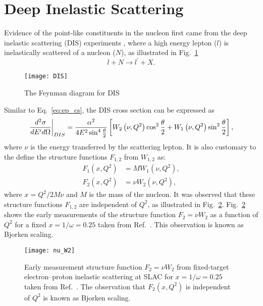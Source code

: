 \documentclass[../main.tex]{subfiles}
\begin{document}
\section {Deep Inelastic Scattering}
\label{sec:dis}
Evidence of the point-like constituents in the nucleon first came from the deep
inelastic scattering (DIS) experiments \cite{breidenbach1969}, where a high 
energy lepton ($l$) is inelastically scattered of a nucleon ($N$), as 
illustrated in Fig.\ \ref{fig:DIS}
\begin{equation}
	l + N \rightarrow l^\prime + X.
\end{equation}
\begin{figure}[htbp!]
    \centering
    \texttt{[image: DIS]}
    \caption{The Feynman diagram for DIS}
    \label{fig:DIS}
\end{figure}
Similar to Eq.\ \ref{eq:ep_cs}, the DIS cross section can be expressed as 
\begin{equation}
	\eval{\frac{d^2\sigma}{dE^\prime d\Omega}}_{DIS} = \frac{\alpha^2}{4E^2 \sin^4 
	\frac{\theta}{2}} \left[ W_2\left(\nu,Q^2\right)\cos^2
	\frac{\theta}{2} + W_1\left(\nu,Q^2\right)\sin^2 \frac{\theta}{2}
	\right],
	\label{eq:DIS_cs1}
\end{equation}
where $\nu$ is the energy transferred by the scattering lepton. It is also 
customary to the define the structure functions $F_{1,2}$ from $W_{1,2}$ as:
\begin{equation}
	\begin{split}
		F_1\left(x,Q^2\right) &= MW_1\left(\nu,Q^2\right),\\
		F_2\left(x,Q^2\right) &= \nu W_2\left(\nu,Q^2\right),
	\end{split}
\end{equation}
where $x=Q^2/2M\nu$ and $M$ is the mass of the nucleon. It was observed that 
these structure functions $F_{1,2}$ are independent of $Q^2$, as illustrated in
Fig.\ \ref{fig:w2}. Fig.\ \ref{fig:w2} shows the early measurements of the 
structure function $F_2=\nu W_2$ as a function of $Q^2$ for a fixed 
$x=1/\omega=0.25$ taken from Ref.\ \cite{friedman1972}. This observation is 
known as Bjorken scaling\cite{bjorken1969}.
\begin{figure}[htpb!]
	\centering
	\texttt{[image: nu\_W2]}
	\caption{Early measurement structure function $F_2=\nu W_2$ from 
	fixed-target electron–proton inelastic scattering at SLAC for 
	$x=1/\omega=0.25$ taken from Ref.\ \cite{friedman1972}. The observation 
	that $F_2(x,Q^2)$ is independent of $Q^2$ is known as Bjorken scaling. }
	\label{fig:w2}
\end{figure}
\end{document}
